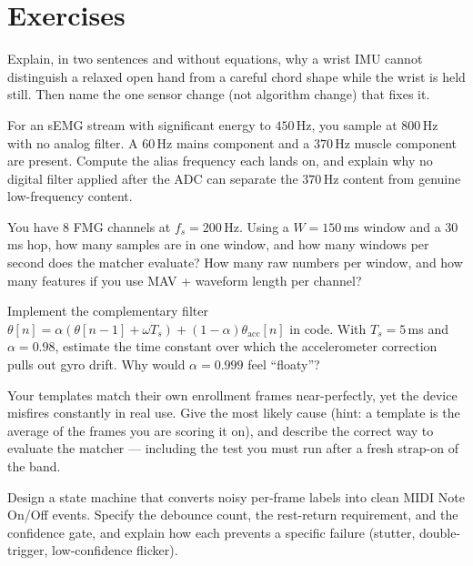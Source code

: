 \section{Exercises}
\label{ch41:exercises}

\begin{exercise}
Explain, in two sentences and without equations, why a wrist IMU cannot
distinguish a relaxed open hand from a careful chord shape while the wrist is
held still. Then name the one sensor change (not algorithm change) that fixes it.
\end{exercise}

\begin{exercise}
For an sEMG stream with significant energy to $450\,$Hz, you sample at
$800\,$Hz with no analog filter. A $60\,$Hz mains component and a $370\,$Hz
muscle component are present. Compute the alias frequency each lands on, and
explain why no digital filter applied after the ADC can separate the $370\,$Hz
content from genuine low-frequency content.
\end{exercise}

\begin{exercise}
You have 8 FMG channels at $f_s = 200\,$Hz. Using a $W = 150\,$ms window and a
$30\,$ms hop, how many samples are in one window, and how many windows per
second does the matcher evaluate? How many raw numbers per window, and how many
features if you use MAV + waveform length per channel?
\end{exercise}

\begin{exercise}
Implement the complementary filter
$\theta[n]=\alpha(\theta[n-1]+\omega T_s)+(1-\alpha)\theta_{\text{acc}}[n]$ in
code. With $T_s=5\,$ms and $\alpha=0.98$, estimate the time constant over which
the accelerometer correction pulls out gyro drift. Why would $\alpha=0.999$ feel
``floaty''?
\end{exercise}

\begin{exercise}
Your templates match their own enrollment frames near-perfectly, yet the device
misfires constantly in real use. Give the most likely cause (hint: a template is
the average of the frames you are scoring it on), and describe the correct
way to evaluate the matcher --- including the test you must run after a fresh
strap-on of the band.
\end{exercise}

\begin{exercise}
Design a state machine that converts noisy per-frame labels into clean MIDI Note
On/Off events. Specify the debounce count, the rest-return requirement, and the
confidence gate, and explain how each prevents a specific failure (stutter,
double-trigger, low-confidence flicker).
\end{exercise}


